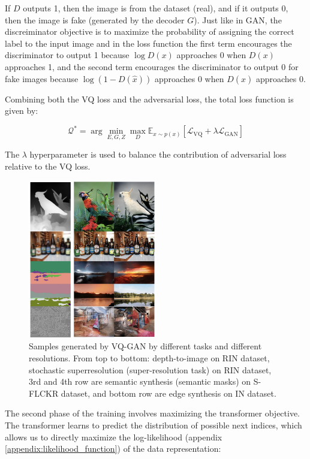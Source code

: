 If $D$ outputs 1, then the image is from the dataset (real), and if it outputs 0, then the image is fake (generated by the decoder $G$). Just like in GAN, the discreiminator objective is to maximize the probability of assigning the correct label to the input image and in the loss function the first term encourages the discriminator to output 1 because $\log D(x)$ approaches 0 when $D(x)$ approaches 1, and the second term encourages the discriminator to output 0 for fake images because $\log (1-D(\hat{x}))$ approaches 0 when $D(\hat{x})$ approaches 0.

Combining both the VQ loss and the adversarial loss, the total loss function is given by:

\begin{equation}
    \mathcal{Q^*} = \arg \min_{E, G, Z} \max_D \mathbb{E}_{x \sim p(x)} [\mathcal{L}_{\text{VQ}} + \lambda \mathcal{L}_{\text{GAN}}]
\end{equation}

The $\lambda$ hyperparameter is used to balance the contribution of adversarial loss relative to the VQ loss.

\begin{figure}
    \centering
    \includegraphics[width=0.5\textwidth]{images/vqgan_samples2.png}
    \caption{Samples generated by VQ-GAN by different tasks and different resolutions. From top to bottom: depth-to-image on RIN dataset, stochastic superresolution (super-resolution task) on RIN dataset, 3rd and 4th row are semantic synthesis (semantic masks) on S-FLCKR dataset, and bottom row are edge synthesis on IN dataset.}
\end{figure}





The second phase of the training involves maximizing the transformer objective. The transformer learns to predict the distribution of possible next indices, which allows us to directly maximize the log-likelihood (appendix \ref{appendix:likelihood_function}) of the data representation:

